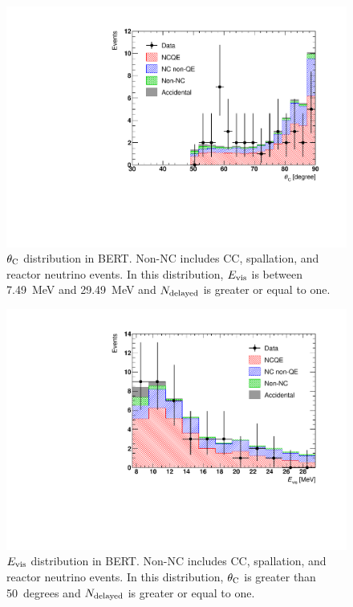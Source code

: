 \begin{figure}[h]
	\centering
	\includegraphics[width=12cm]{PDF/Figure02_02/FTFP_BERT_HP/Figure02_Poisson}
	\caption[$\theta_{\rm C}$ distribution in BERT]{
	$\theta_{\rm C}$ distribution in BERT.
	Non-NC includes CC, spallation, and reactor neutrino events.
	In this distribution, $E_{\rm vis}$ is between 7.49~MeV and 29.49~MeV and $N_{\rm delayed}$ is greater or equal to one.
	}\label{FTFP_BERT_HP_Figure02_Poisson}
\end{figure}

\begin{figure}[h]
	\centering
	\includegraphics[width=12cm]{PDF/Figure08/FTFP_BERT_HP/Figure08_Poisson}
	\caption[$E_{\rm vis}$ distribution in BERT]{
	$E_{\rm vis}$ distribution in BERT.
	Non-NC includes CC, spallation, and reactor neutrino events.
	In this distribution, $\theta_{\rm C}$ is greater than 50~degrees and $N_{\rm delayed}$ is greater or equal to one.
	}\label{FTFP_BERT_HP_Figure08_Poisson}
\end{figure}


